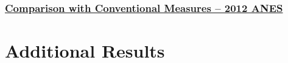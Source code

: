 \subsection{}
\begin{frame} %
\frametitle{\hyperlink{corplot_components}{Comparison with Conventional Measures -- 2012 ANES}}\label{corplot}
  \begin{figure}
  \end{figure}
\end{frame}

\section{Additional Results}

